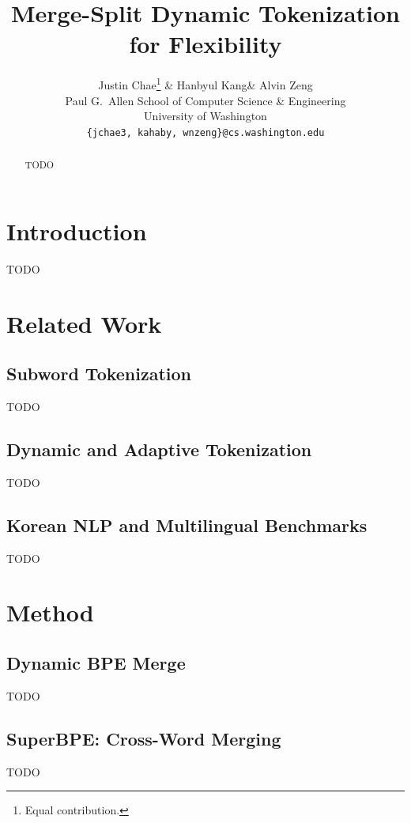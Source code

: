 \documentclass{article} %
\title{Merge-Split Dynamic Tokenization for Flexibility}
\author{Justin Chae\thanks{Equal contribution.} \& Hanbyul Kang\footnotemark[1] \& Alvin Zeng\footnotemark[1] \\
Paul G.\ Allen School of Computer Science \& Engineering \\
University of Washington \\
\texttt{\{jchae3, kahaby, wnzeng\}@cs.washington.edu}
}
\begin{document}
\maketitle

\begin{abstract}
TODO
\end{abstract}

\section{Introduction}
\label{sec:intro}

TODO

\section{Related Work}
\label{sec:related}

\subsection{Subword Tokenization}
TODO

\subsection{Dynamic and Adaptive Tokenization}
TODO

\subsection{Korean NLP and Multilingual Benchmarks}
TODO

\section{Method}
\label{sec:method}

\subsection{Dynamic BPE Merge}
TODO

\subsection{SuperBPE: Cross-Word Merging}
TODO
\end{document}
